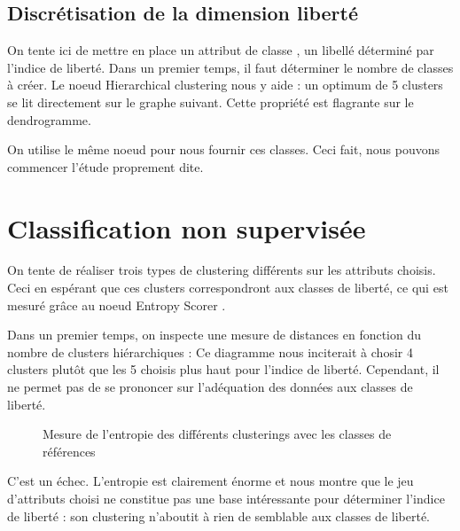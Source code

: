 \subsection{Discrétisation de la dimension \og liberté \fg}
On tente ici de mettre en place un attribut de \og classe \fg, un libellé déterminé par l'indice de liberté. Dans un premier temps, il faut déterminer le nombre de classes à créer. Le noeud \og Hierarchical clustering \fg nous y aide : un optimum de 5 clusters se lit directement sur le graphe suivant.
Cette propriété est flagrante sur le dendrogramme.

On utilise le même noeud pour nous fournir ces classes. Ceci fait, nous pouvons commencer l'étude proprement dite.

\section{Classification non supervisée}
On tente de réaliser trois types de clustering différents sur les attributs choisis. Ceci en espérant que ces clusters correspondront aux classes de liberté, ce qui est mesuré grâce au noeud \og Entropy Scorer \fg.

Dans un premier temps, on inspecte une mesure de distances en fonction du nombre de clusters hiérarchiques :
Ce diagramme nous inciterait à chosir 4 clusters plutôt que les 5 choisis plus haut pour l'indice de liberté. Cependant, il ne permet pas de se prononcer sur l'adéquation des données aux classes de liberté.

\begin{figure}[H]
	\centering
	\caption{Mesure de l'entropie des différents clusterings avec les classes de références}
\end{figure}
C'est un échec. L'entropie est clairement énorme et nous montre que le jeu d'attributs choisi ne constitue pas une base intéressante pour déterminer l'indice de liberté : son clustering n'aboutit à rien de semblable aux classes de liberté.

